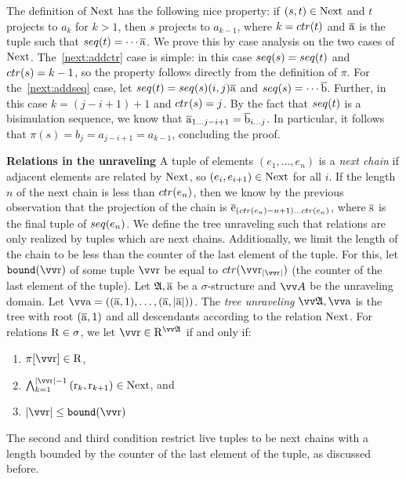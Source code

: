 \noindent
The definition of $\mathrm{Next}$ has the following nice property: if $(s,t) \in \mathrm{Next}$ and $t$ projects to $a_{k}$ for $k > 1$, then $s$ projects to $a_{k-1}$, where $k = \ctr{t}$ and $\overline{\mathrm{a}}$ is the tuple such that $\seq{t} = \cdots \elemtuplea$.
We prove this by case analysis on the two cases of $\mathrm{Next}$.
The~\ref{next:addctr} case is simple: in this case $\seq{s} = \seq{t}$ and $\ctr{s} = k - 1$, so the property follows directly from the definition of $\pi$.
For the~\ref{next:addseq} case, let $\seq{t} = \seq{s} (i,j) \elemtuplea$ and $\seq{s} = \cdots \elemtupleb$.
Further, in this case $k = (j - i + 1) + 1$ and $\ctr{s} = j$.
By the fact that $\seq{t}$ is a bisimulation sequence, we know that $\overline{\mathrm{a}}_{1\ldots j-i+1} = \overline{\mathrm{b}}_{i\ldots j}$.
In particular, it follows that $\pi(s) = b_{j} = a_{j-i+1} = a_{k-1}$, concluding the proof.

\noindent
\textbf{Relations in the unraveling}
A tuple of elements $(e_{1}, \ldots, e_{n})$ is a \emph{next chain} if adjacent elements are related by $\mathrm{Next}$, so $(e_{i}, e_{i+1}) \in \mathrm{Next}$ for all $i$.
If the length $n$ of the next chain is less than $\ctr{e_{n}}$, then we know by the previous observation that the projection of the chain is $\elemtuplee_{(\ctr{e_{n}}-n+1)\ldots{}\ctr{e_{n}}}$, where $\overline{\mathrm{s}}$ is the final tuple of $\seq{e_{n}}$.
We define the tree unraveling such that relations are only realized by tuples which are next chains.
Additionally, we limit the length of the chain to be less than the counter of the last element of the tuple.
For this, let $\mathtt{bound}(\elemtuptupler)$ of some tuple $\elemtuptupler$ be equal to $\ctr{\elemtuptupler_{|\elemtuptupler|}}$ (the counter of the last element of the tuple).
Let ${\mathfrak{A}}, \overline{\mathrm{a}}$ be a $\sigma$-structure and $\unraveldom{A}$ be the unraveling domain.
Let $\elemtuptuplea = ((\elemtuplea, 1), \ldots, (\elemtuplea, |\elemtuplea|))$.
The \emph{tree unraveling} $\unravel{A}, \elemtuptuplea$ is the tree with root $(\overline{\mathrm{a}}, 1)$ and all descendants according to the relation $\mathrm{Next}$.
For relations $\mathrm{R} \in \sigma$, we let $\elemtuptupler \in \relR^{\unravel{A}}$ if and only if:
\begin{enumerate}
  \item $\pi[\elemtuptupler] \in \relR^{}$,
  \item $\bigwedge_{k=1}^{|\elemtuptupler|-1}{(\elemr_{k},\elemr_{k+1}) \in \relNext}$, and
  \item $|\elemtuptupler| \le \mathtt{bound}(\elemtuptupler)$
\end{enumerate}
The second and third condition restrict live tuples to be next chains with a length bounded by the counter of the last element of the tuple, as discussed before.

